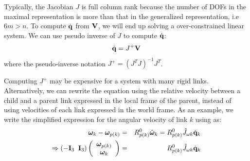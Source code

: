 Typically, the Jacobian $J$ is full column rank because the
number of DOFs in the maximal representation is more than that in the
generalized representation, i.e $6m > n$. To compute $\dot{\mathbf{q}}$ from $\mathbf{V}$, we
will end up solving a over-constrained linear system. We can use
pseudo inverse of $J$ to compute $\dot{\mathbf{q}}$:
\begin{equation}
 \dot{\mathbf{q}} =  J^+\mathbf{V}
 \end{equation}
where the pseudo-inverse notation $J^+ = (J^TJ)^{-1}J^T$. 

Computing $J^+$ may be expensive for a system with many rigid links. 
Alternatively, we can rewrite the equation using the relative velocity between a child and a parent link expressed in the local
frame of the parent, instead of using velocities of each link
expressed in the world frame. As an example, we write the simplified expression for the angular velocity of link $k$ using  as: 
\begin{eqnarray}
\nonumber
\bm{\omega}_k - \bm{\omega}_{p(k)} & = & R^0_{p(k)}\hat{\bm{\omega}}_k = R^0_{p(k)}\hat{J}_{\omega k} \dot{\mathbf{q}}_k \\
\Rightarrow \left ( -\mathbf{I}_3\;\; \mathbf{I}_3 \right ) 
\left ( 
\begin{array}{c}
\bm{\omega}_{p(k)}\\
\bm{\omega}_k
\end{array}
\right ) & = & R^0_{p(k)}\hat{J}_{\omega k} \dot{\mathbf{q}}_k
\end{eqnarray}


